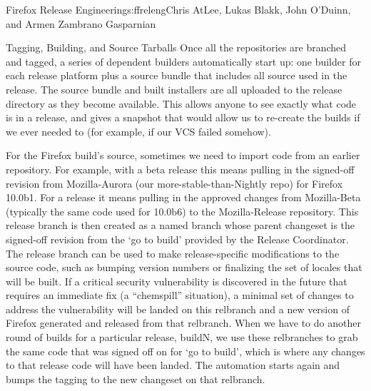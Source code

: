 \begin{aosachapter}{Firefox Release Engineering}{s:ffreleng}{Chris AtLee, Lukas Blakk, John O'Duinn, and Armen Zambrano Gasparnian}
\begin{aosasect1}{Tagging, Building, and Source Tarballs}
Once all the repositories are branched and tagged, a series of dependent builders
automatically start up: one builder for each release platform plus a
source bundle that includes all source used in the release.  The source
bundle and built installers are all uploaded to the release directory
as they become available.  This allows anyone to see exactly what code
is in a release, and gives a snapshot that would allow us to re-create
the builds if we ever needed to (for example, if our VCS failed somehow).
 
For the Firefox build's source, sometimes we need to import code
from an earlier repository. For example, with a beta release this means
pulling in the signed-off revision from Mozilla-Aurora (our
more-stable-than-Nightly repo) for Firefox 10.0b1. For a release it
means pulling in the approved changes from Mozilla-Beta (typically the
same code used for 10.0b6) to the Mozilla-Release repository.  This release
branch is then created as a named branch whose parent changeset is
the signed-off revision from the `go to build' provided by the Release
Coordinator. The release branch can be used to make release-specific
modifications to the source code, such as bumping version numbers or
finalizing the set of locales that will be built. If a critical
security vulnerability is discovered in the future that requires an
immediate fix (a ``chemspill'' situation), a minimal set of changes to
address the vulnerability will be landed on this relbranch and a new
version of Firefox generated and released from that relbranch. When we have to do another round of
builds for a particular release, buildN, we use these relbranches to
grab the same code that was signed off on for `go to build', which is
where any changes to that release code will have been landed. The
automation starts again and bumps the tagging to the new changeset on
that relbranch.
    

\end{aosasect1}
\end{aosachapter}
